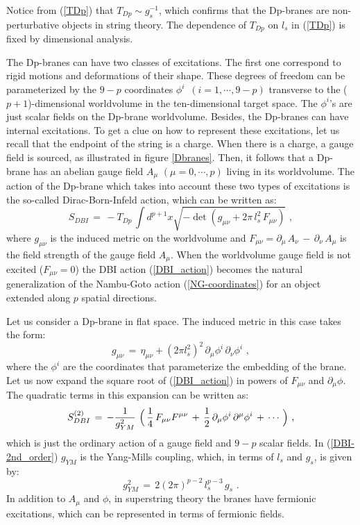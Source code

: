 \documentclass[12pt,notitlepage,a4paper]{article}
\newcommand{\beq}{\begin{equation}}
\newcommand{\eeq}{\end{equation}}
\begin{document}
Notice from (\ref{TDp}) that $T_{Dp}\sim g_s^{-1}$,  which confirms that the Dp-branes are non-perturbative objects in string theory. The dependence of $T_{Dp}$ on $l_s$ in (\ref{TDp}) is fixed by dimensional analysis. 

The Dp-branes can have two classes of excitations. The first one correspond to  rigid motions and deformations of their shape. These degrees of freedom can be parameterized by the  $9-p$  coordinates $\phi^{i}\,\,\,(i=1,\cdots,9-p)$ transverse to the ($p+1$)-dimensional worldvolume in the ten-dimensional target space. The $\phi^{i}$'s are just  scalar fields on the  Dp-brane worldvolume. Besides, the Dp-branes can have internal excitations. To get a clue on how to represent these excitations, let us recall that the endpoint of the string is a charge. When  there is a charge,  a gauge field is sourced, as illustrated in figure \ref{Dbranes}. Then, it follows that a Dp-brane has an abelian gauge field $A_{\mu}$ $(\mu=0,\cdots, p)$ living  in its worldvolume. The action of the Dp-brane which takes into account these two types of excitations is the so-called Dirac-Born-Infeld action, which can be written as:
\beq
S_{DBI}\,=\,-T_{Dp}\,\int d^{p+1} x \sqrt{-\det (g_{\mu\nu}+2\pi\, l_s^2 \,F_{\mu\nu})}\,\,,
\label{DBI_action}
\eeq
where $g_{\mu\nu}$ is the induced metric on the worldvolume and 
$F_{\mu\nu}=\partial_{\mu}\,A_{\nu}\,-\,\partial_{\nu}\,A_{\mu}$ is the field strength of the gauge field $A_{\mu}$. When the worldvolume gauge field is not excited ($F_{\mu\nu}=0$) the DBI action (\ref{DBI_action}) becomes the natural generalization of the Nambu-Goto action (\ref{NG-coordinates}) for an object extended along $p$ spatial directions. 



Let us consider  a Dp-brane in flat space. The induced metric in this case takes the form:
\beq
g_{\mu\nu}\,=\,\eta_{\mu\nu}+(2\pi l_s^2)^2\,\partial_{\mu}\phi^i\,\partial_{\nu}\phi^i\,\,,
\eeq
where the $\phi^i$ are the coordinates that parameterize the embedding of the brane. 
Let us now expand the square root of (\ref{DBI_action}) in powers of $F_{\mu\nu}$ and $\partial_\mu\phi$.  The quadratic terms in this expansion can be written as:
\beq
S_{DBI}^{(2)}\,=\,-{1\over g^2_{YM}}\,\,
\Big(\,{1\over 4}\,F_{\mu\nu}F^{\mu\nu}\,+\,{1\over 2}\,
\partial_{\mu}\phi^i\,\partial^{\mu}\phi^i\,+\,\cdots\,\Big)\,\,,
\label{DBI-2nd_order}
\eeq
which is just the ordinary action of a gauge field and $9-p$ scalar fields. In (\ref{DBI-2nd_order})
 $g_{YM}$ is the Yang-Mills coupling, which, in terms of $l_s$ and $g_s$, is given by:
\beq
g^2_{YM}\,=\,2(2\pi)^{p-2}\,l_s^{p-3}\,g_s\,\,.
\label{gYM-p}
\eeq
In addition to $A_{\mu}$ and $\phi$, in superstring theory the branes have fermionic excitations, which can be represented in terms of fermionic fields.
\end{document}
